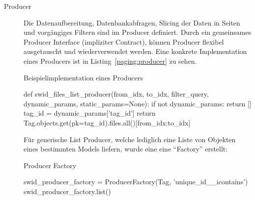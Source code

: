 \begin{description}
	\item[Producer] Die Datenaufbereitung, Datenbankabfragen, Slicing der Daten in
	Seiten und vorgängiges Filtern sind im Producer definiert. Durch ein
	gemeinsames Producer Interface (impliziter Contract\cite{contracts:2003}),
	können Producer flexibel ausgetauscht und wiederverwendet werden. Eine konkrete
	Implementation eines Producers ist in Listing~\ref{paging:producer} zu sehen.
	
\begin{listing}
\caption{Beispielimplementation eines Producers}
\label{paging:producer}
\begin{pythoncode}
def swid_files_list_producer(from_idx, to_idx, filter_query, dynamic_params, static_params=None):
 if not dynamic_params:
     return []
 tag_id = dynamic_params['tag_id']
 return Tag.objects.get(pk=tag_id).files.all()[from_idx:to_idx]
\end{pythoncode}
\end{listing}
	
	Für generische List Producer, welche lediglich eine Liste von Objekten eines
	bestimmten Models liefern, wurde eine eine \enquote{Factory} erstellt:
	
\begin{listing}
\caption{Producer Factory}
\begin{pythoncode}
swid_producer_factory = ProducerFactory(Tag, 'unique_id__icontains')
swid_producer_factory.list()
\end{pythoncode}
\end{listing}
	

\end{description}

%
%

